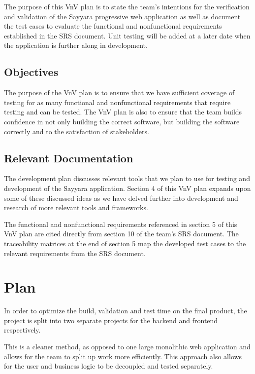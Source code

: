 \documentclass[12pt, titlepage]{article}
\begin{document}
The purpose of this VnV plan is to state the team's intentions for the verification and validation of the Sayyara progressive web application as well as document the test cases to evaluate the functional and nonfunctional requirements established in the SRS document. Unit testing will be added at a later date when the application is further along in development.

\subsection{Objectives}
  
The purpose of the VnV plan is to ensure that we have sufficient coverage of testing for as many functional and nonfunctional requirements that require testing and can be tested. The VnV plan is also to ensure that the team builds confidence in not only building the correct software, but building the software correctly and to the satisfaction of stakeholders.

\subsection{Relevant Documentation}
  
The development plan discusses relevant tools that we plan to use for testing and development of the Sayyara application. Section 4 of this VnV plan expands upon some of these discussed ideas as we have delved further into development and research of more relevant tools and frameworks.

\noindent The functional and nonfunctional requirements referenced in section 5 of this VnV plan are cited directly from section 10 of the team's SRS document. The traceability matrices at the end of section 5 map the developed test cases to the relevant requirements from the SRS document.

\section{Plan}

In order to optimize the build, validation and test time on the final product, the project is split into two separate projects for the backend and frontend respectively.

\noindent This is a cleaner method, as opposed to one large monolithic web application and allows for the team to split up work more efficiently. This approach also allows for the user and business logic to be decoupled and tested separately.
\end{document}
